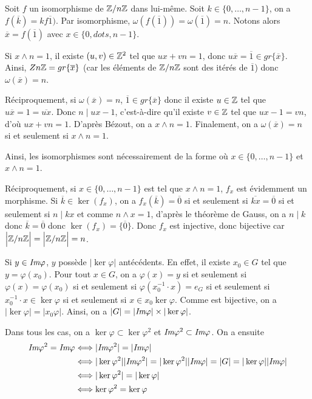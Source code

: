 \begin{solution}
	Soit $f$ un isomorphisme de $\mathbb{Z}/n\mathbb{Z}$ dans lui-même. Soit $k\in\{0,\dots,n-1\}$, on a $f(\overline{k})=kf\overline{1})$. Par isomorphisme, $\omega(f(\overline{1}))=\omega(\overline{1})=n$. Notons alors $\overline{x}=f(\overline{1})$ avec $x\in\{0,dots,n-1\}$.

	Si $x\wedge n=1$, il existe $(u,v)\in\mathbb{Z}^{2}$ tel que $ux+vn=1$, donc $u\overline{x}=\overline{1}\in gr\{\overline{x}\}$. Ainsi, $Z\/n\mathbb{Z}=gr\{\overline{x}\}$ (car les éléments de $\mathbb{Z}/n\mathbb{Z}$ sont des itérés de $\overline{1}$) donc $\omega(\overline{x})=n$.

	Réciproquement, si $\omega(\overline{x})=n$, $\overline{1}\in gr\{\overline{x}\}$ donc il existe $u\in\mathbb{Z}$ tel que $u\overline{x}=1=\overline{ux}$. Donc $n\mid ux-1$, c'est-à-dire qu'il existe $v\in\mathbb{Z}$ tel que $ux-1=vn$, d'où $ux+vn=1$. D'après Bézout, on a $x\wedge n=1$. Finalement, on a $\omega(\overline{x})=n$ si et seulement si $x\wedge n=1$.

	Ainsi, les isomorphismes sont nécessairement de la forme 
	où $x\in\{0,\dots,n-1\}$ et $x\wedge n=1$.

	Réciproquement, si $x\in\{0,\dots,n-1\}$ est tel que $x\wedge n=1$, $f_{x}$ est évidemment un morphisme. Si $\overline{k}\in\ker(f_{x})$, on a $f_{x}(\overline{k})=\overline{0}$ si et seulement si $\overline{kx}=\overline{0}$ si et seulement si $n\mid kx$ et comme $n\wedge x=1$, d'après le théorème de Gauss, on a $n\mid k$ donc $\overline{k}=\overline{0}$ donc $\ker(f_{x})=\{\overline{0}\}$. Donc $f_{x}$ est injective, donc bijective car $\Bigl\vert\mathbb{Z}/n\mathbb{Z}\Bigr\vert=\Bigl\vert\mathbb{Z}/n\mathbb{Z}\Bigr\vert=n$.
\end{solution}

\begin{solution}
	Si $y\in \emph{Im}\varphi$, $y$ possède $\vert\ker\varphi\vert$ antécédents. En effet, il existe $x_{0}\in G$ tel que $y=\varphi(x_{0})$. Pour tout $x\in G$, on a $\varphi(x)=y$ si et seulement si $\varphi(x)=\varphi(x_{0})$ si et seulement si $\varphi(x_{0}^{-1}\cdot x)=e_{G}$ si et seulement si $x_{0}^{-1}\cdot x\in\ker\varphi$ si et seulement si $x\in x_{0}\ker\varphi$. Comme 
	est bijective, on a $\vert\ker\varphi\vert=\vert x_{0}\varphi\vert$. Ainsi, on a $\vert G\vert=\vert\emph{Im}\varphi\vert\times\vert\ker\varphi\vert$.

	Dans tous les cas, on a $\ker\varphi\subset\ker\varphi^{2}$ et $\emph{Im}\varphi^{2}\subset\emph{Im}\varphi$. On a ensuite 
	\begin{align*}
		\emph{Im}\varphi^{2}=\emph{Im}\varphi
		&\Longleftrightarrow \vert\emph{Im}\varphi^{2}\vert=\vert\emph{Im}\varphi\vert\\
		&\Longleftrightarrow \vert\ker\varphi^{2}\vert\vert\emph{Im}\varphi^{2}\vert=\vert\ker\varphi^{2}\vert\vert\emph{Im}\varphi\vert=\vert G\vert=\vert\ker\varphi\vert\vert\emph{Im}\varphi\vert\\
		&\Longleftrightarrow \vert\ker\varphi^{2}\vert=\vert\ker\varphi\vert\\
		&\Longleftrightarrow \ker\varphi^{2}=\ker\varphi
	\end{align*}
\end{solution}

